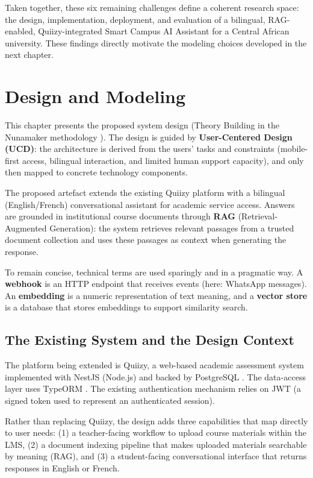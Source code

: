 \documentclass[a4paper,9pt,twocolumn]{extarticle}
\begin{document}
Taken together, these six remaining challenges define a coherent
research space: the design, implementation, deployment, and evaluation
of a bilingual, RAG-enabled, Quiizy-integrated Smart Campus AI Assistant
for a Central African university. These findings directly motivate the
modeling choices developed in the next chapter.

\section{Design and Modeling}
\label{sec:model}

This chapter presents the proposed system design (Theory Building in the
Nunamaker methodology \cite{nunamaker1991}). The design is guided by
\textbf{User-Centered Design (UCD)}: the architecture is derived from the
users' tasks and constraints (mobile-first access, bilingual interaction,
and limited human support capacity), and only then mapped to concrete
technology components.

The proposed artefact extends the existing Quiizy platform with a
bilingual (English/French) conversational assistant for academic service
access. Answers are grounded in institutional course documents through
\textbf{RAG} (Retrieval-Augmented Generation): the system retrieves relevant
passages from a trusted document collection and uses these passages as
context when generating the response.

To remain concise, technical terms are used sparingly and in a pragmatic
way. A \textbf{webhook} is an HTTP endpoint that receives events (here:
WhatsApp messages). An \textbf{embedding} is a numeric representation of
text meaning, and a \textbf{vector store} is a database that stores
embeddings to support similarity search.

\subsection{The Existing System and the Design Context}
\label{sec:model:context}

The platform being extended is Quiizy, a web-based academic assessment
system implemented with NestJS (Node.js) and backed by PostgreSQL
\cite{nestjsDocs,postgresDocs}. The data-access layer uses TypeORM
\cite{typeormDocs}. The existing authentication mechanism relies on JWT
(a signed token used to represent an authenticated session).

Rather than replacing Quiizy, the design adds three capabilities that map
directly to user needs:
(1) a teacher-facing workflow to upload course materials within the LMS,
(2) a document indexing pipeline that makes uploaded materials searchable
by meaning (RAG), and (3) a student-facing conversational interface that
returns responses in English or French.
\end{document}
